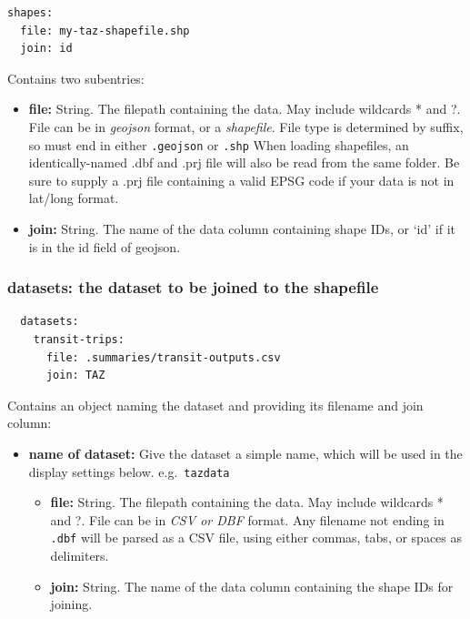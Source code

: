 \begin{lstlisting}
shapes:
  file: my-taz-shapefile.shp
  join: id
\end{lstlisting}

Contains two subentries:

\begin{itemize}
\tightlist
\item
  \textbf{file:} String. The filepath containing the data. May include
  wildcards * and ?. File can be in \emph{geojson} format, or a
  \emph{shapefile}. File type is determined by suffix, so must end in
  either \texttt{.geojson} or \texttt{.shp} When loading shapefiles, an
  identically-named .dbf and .prj file will also be read from the same
  folder. Be sure to supply a .prj file containing a valid EPSG code if
  your data is not in lat/long format.
\item
  \textbf{join:} String. The name of the data column containing shape
  IDs, or `id' if it is in the id field of geojson.
\end{itemize}

\hypertarget{datasets-the-dataset-to-be-joined-to-the-shapefile}{%
\subsubsection{\texorpdfstring{\textbf{datasets:} the dataset to be
joined to the
shapefile}{datasets: the dataset to be joined to the shapefile}}\label{datasets-the-dataset-to-be-joined-to-the-shapefile}}

\begin{lstlisting}
  datasets:
    transit-trips:
      file: .summaries/transit-outputs.csv
      join: TAZ
\end{lstlisting}

Contains an object naming the dataset and providing its filename and
join column:

\begin{itemize}
\tightlist
\item
  \textbf{name of dataset:} Give the dataset a simple name, which will
  be used in the display settings below. e.g.~\texttt{tazdata}

  \begin{itemize}
  \tightlist
  \item
    \textbf{file:} String. The filepath containing the data. May include
    wildcards * and ?. File can be in \emph{CSV or DBF} format. Any
    filename not ending in \texttt{.dbf} will be parsed as a CSV file,
    using either commas, tabs, or spaces as delimiters.
  \item
    \textbf{join:} String. The name of the data column containing the
    shape IDs for joining.
  \end{itemize}
\end{itemize}

